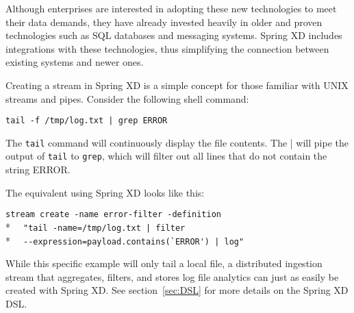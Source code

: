 Although enterprises are interested in adopting these new technologies to
meet their data demands, they have already invested heavily in older and proven
technologies such as SQL databases and messaging systems. Spring XD includes
integrations with these technologies, thus simplifying the connection between
existing systems and newer ones.

Creating a stream in Spring XD is a simple concept for those familiar with
UNIX streams and pipes. Consider the following shell command:

\verb;tail -f /tmp/log.txt | grep ERROR;

The \texttt{tail} command will continuously display the file contents. The |
will pipe the output of \texttt{tail} to \texttt{grep}, which will filter 
out all lines that do not contain the string ERROR.

The equivalent using Spring XD looks like this:

\verb;stream create -name error-filter -definition;\\*
\verb;  "tail -name=/tmp/log.txt | filter;\\*
\verb;  --expression=payload.contains(`ERROR') | log";

While this specific example will only tail a local file, a distributed 
ingestion stream that aggregates, filters, and stores log file analytics
can just as easily be created with Spring XD. See section~\ref{sec:DSL} for more
details on the Spring XD DSL.
